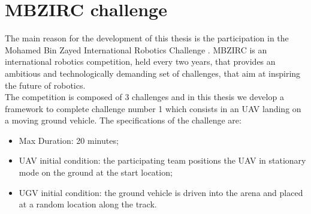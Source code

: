 



\section{MBZIRC challenge}\label{chap:thechallenge}
The main reason for the development of this thesis is the participation in the Mohamed Bin Zayed International Robotics Challenge \cite{challenge_description}. MBZIRC is an international robotics competition, held every two years, that provides an ambitious and technologically demanding set of challenges, that aim at inspiring the future of robotics.\\ 

The competition is composed of 3 challenges and in this thesis we develop a framework to complete challenge number 1 which consists in an UAV landing on a moving ground vehicle. 
The specifications of the challenge are:
\begin{itemize}
\item Max Duration:  20 minutes;
\item UAV initial condition: the participating team positions the UAV in stationary mode on the ground at the start location;
\item UGV initial condition: the ground vehicle is driven into the arena and placed at a random location along the track.
\end{itemize}


